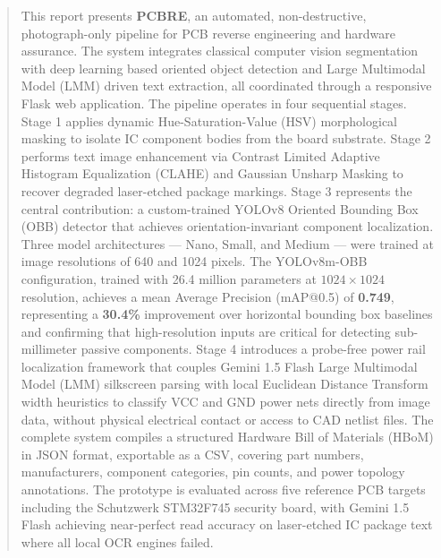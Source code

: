 \documentclass[12pt,a4paper]{report}
\begin{document}
\begin{abstract}
This report presents \textbf{PCBRE}, an automated, non-destructive, photograph-only pipeline for PCB reverse engineering and hardware assurance. The system integrates classical computer vision segmentation with deep learning based oriented object detection and Large Multimodal Model (LMM) driven text extraction, all coordinated through a responsive Flask web application. The pipeline operates in four sequential stages. Stage 1 applies dynamic Hue-Saturation-Value (HSV) morphological masking to isolate IC component bodies from the board substrate. Stage 2 performs text image enhancement via Contrast Limited Adaptive Histogram Equalization (CLAHE) and Gaussian Unsharp Masking to recover degraded laser-etched package markings. Stage 3 represents the central contribution: a custom-trained YOLOv8 Oriented Bounding Box (OBB) detector that achieves orientation-invariant component localization. Three model architectures --- Nano, Small, and Medium --- were trained at image resolutions of 640 and 1024 pixels. The YOLOv8m-OBB configuration, trained with 26.4 million parameters at \(1024 \times 1024\) resolution, achieves a mean Average Precision (mAP@0.5) of \textbf{0.749}, representing a \textbf{30.4\%} improvement over horizontal bounding box baselines and confirming that high-resolution inputs are critical for detecting sub-millimeter passive components. Stage 4 introduces a probe-free power rail localization framework that couples Gemini 1.5 Flash Large Multimodal Model (LMM) silkscreen parsing with local Euclidean Distance Transform width heuristics to classify VCC and GND power nets directly from image data, without physical electrical contact or access to CAD netlist files. The complete system compiles a structured Hardware Bill of Materials (HBoM) in JSON format, exportable as a CSV, covering part numbers, manufacturers, component categories, pin counts, and power topology annotations. The prototype is evaluated across five reference PCB targets including the Schutzwerk STM32F745 security board, with Gemini 1.5 Flash achieving near-perfect read accuracy on laser-etched IC package text where all local OCR engines failed.

\end{abstract}

\newpage

\tableofcontents
\newpage

\listoffigures
\newpage
\end{document}
